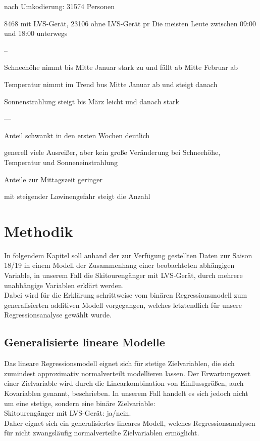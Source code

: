 \documentclass[12pt]{article}
\begin{document}
	nach Umkodierung: 31574 Personen
	
	8468 mit LVS-Gerät, 23106 ohne LVS-Gerät
	pr
	Die meisten Leute zwischen 09:00 und 18:00 unterwegs
	
	--
	
	Schneehöhe nimmt bis Mitte Januar stark zu und fällt ab Mitte Februar ab
	
	Temperatur nimmt im Trend bus Mitte Januar ab und steigt danach
	
	Sonnenstrahlung steigt bis März leicht und danach stark
	
	
	---
	
	
	Anteil schwankt in den ersten Wochen deutlich
	
	generell viele Ausreißer, aber kein große Veränderung bei Schneehöhe, Temperatur und Sonneneinstrahlung
	
	Anteile zur Mittagszeit geringer
	
	mit steigender Lawinengefahr steigt die Anzahl
	
	\section{Methodik}
	In folgendem Kapitel soll anhand der zur Verfügung gestellten Daten zur Saison 18/19 in einem Modell der Zusammenhang einer beobachteten abhängigen Variable, in unserem Fall die Skitourengänger mit LVS-Gerät,  durch mehrere unabhängige Variablen erklärt werden. \\
	Dabei wird für die Erklärung schrittweise vom binären Regressionsmodell zum generalisierten additiven Modell  vorgegangen,  welches  letztendlich  für  unsere  Regressionsanalyse gewählt wurde.
	
	
	\subsection{Generalisierte lineare Modelle}
	Das lineare Regressionsmodell eignet sich für stetige Zielvariablen, die sich zumindest approximativ normalverteilt modellieren lassen. Der Erwartungswert einer  Zielvariable wird durch die Linearkombination von Einflussgrößen, auch  Kovariablen genannt, beschrieben.
	In unserem Fall handelt es sich jedoch nicht um eine stetige, sondern eine binäre  Zielvariable: \\
	Skitourengänger mit LVS-Gerät: ja/nein. \\
	Daher eignet sich ein generalisiertes lineares Modell, welches Regressionsanalysen für nicht zwangsläufig normalverteilte Zielvariablen ermöglicht.
	
\end{document}
